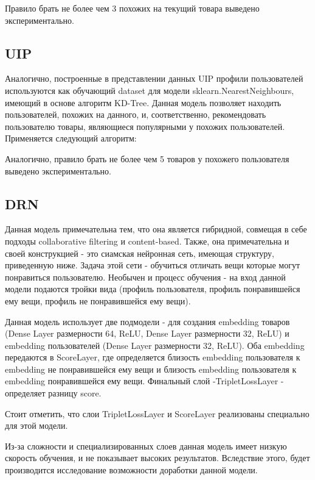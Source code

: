 \documentclass[14pt]{mmcs_article}
\begin{document}
Правило брать не более чем 3 похожих на текущий товара выведено экспериментально.
\subsection{UIP}
Аналогично, построенные в представлении данных UIP профили пользователей используются как обучающий dataset для модели sklearn.NearestNeighbours, имеющий в основе алгоритм KD-Tree. Данная модель позволяет находить пользователей, похожих на данного, и, соответственно, рекомендовать пользователю товары, являющиеся популярными у похожих пользователей.
Применяется следующий алгоритм:

Аналогично, правило брать не более чем 5 товаров у похожего пользователя выведено экспериментально.
\subsection{DRN}

Данная модель примечательна тем, что она является гибридной, совмещая в себе подходы collaborative filtering и content-based. Также, она примечательна и своей конструкцией - это сиамская нейронная сеть, имеющая структуру, приведенную ниже. Задача этой сети - обучиться отличать вещи которые могут понравиться пользователю. Необычен и процесс обучения - на вход данной модели подаются тройки вида (профиль пользователя, профиль понравившейся ему вещи, профиль не понравившейся ему вещи).

Данная модель использует две подмодели - для создания embedding товаров (Dense Layer размерности 64, ReLU, Dense Layer размерности 32, ReLU) и embedding пользователей (Dense Layer размерности 32, ReLU). Оба embedding передаются в ScoreLayer, где определяется близость embedding пользователя к embedding не понравившейся ему вещи и близость embedding пользователя к embedding понравившейся ему вещи.  Финальный слой -TripletLossLayer - определяет разницу score.

Стоит отметить, что слои TripletLossLayer и ScoreLayer реализованы специально для этой модели.

Из-за сложности и специализированных слоев данная модель имеет низкую скорость обучения, и не показывает высоких результатов. Вследствие этого, будет производится исследование возможности доработки данной модели.
\end{document}
